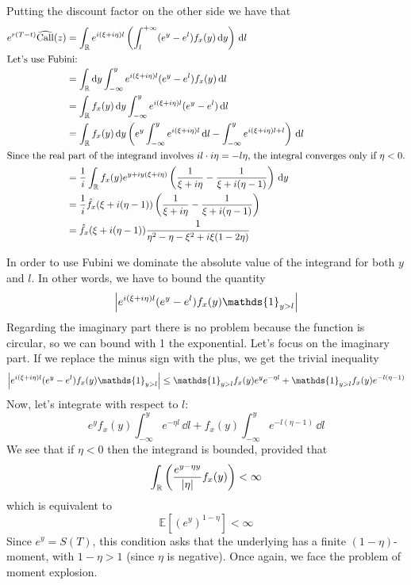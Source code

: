 Putting the discount factor on the other side we have that
\begin{align*}
    e^{r(T-t)}\widehat{\operatorname{Call}}(z) &= \int_{\mathbb{R}} e^{i(\xi+i\eta)l} \left( \int_{l}^{+\infty} (e^y - e^l)f_x(y)\,\dd y \right)\,\dd l \\
    \intertext{Let's use Fubini:}
    &=
    \int_{\mathbb{R}}\dd y \int_{-\infty}^y e^{i(\xi+i\eta)l} (e^y - e^l)f_x(y)\,\dd l \\
    &=
    \int_{\mathbb{R}}f_x(y)\,\dd y \int_{-\infty}^y e^{i(\xi+i\eta)l} (e^y - e^l)\,\dd l \\
    &=
    \int_{\mathbb{R}}f_x(y)\,\dd y \left(e^y \int_{-\infty}^y e^{i(\xi+i\eta)l}\,\dd l - \int_{-\infty}^y e^{i(\xi+i\eta)l + l}\right)\,\dd l \\
    \intertext{Since the real part of the integrand involves $il\cdot i\eta = -l\eta$, the integral converges only if $\eta<0$.}
    &=
    \frac{1}{i} \int_{\mathbb{R}}f_x(y) e^{y + iy(\xi+i\eta)}\left(\frac{1}{\xi+i\eta} - \frac{1}{\xi+i(\eta-1)}\right)\,\dd y \\
    &=
    \frac{1}{i} \hat{f}_x(\xi+i(\eta-1))\left(\frac{1}{\xi+i\eta} - \frac{1}{\xi+i(\eta-1)}\right) \\
    &=
    \hat{f}_x(\xi+i(\eta-1))\frac{1}{\eta^2-\eta-\xi^2+i\xi(1-2\eta)}
\end{align*}
\begin{remark}
    In order to use Fubini we dominate the absolute value of the integrand for both $y$ and $l$. In other words, we have to bound the quantity
    \begin{equation*}
        \abs{e^{i(\xi+i\eta)l} (e^y - e^l)f_x(y)\mathds{1}_{y>l}}
    \end{equation*}
    Regarding the imaginary part there is no problem because the function is circular, so we can bound with 1 the exponential. Let's focus on the imaginary part. If we replace the minus sign with the plus, we get the trivial inequality
    \begin{equation*}
        \abs{e^{i(\xi+i\eta)l} (e^y - e^l)f_x(y)\mathds{1}_{y>l}} \le \mathds{1}_{y>l}f_x(y)e^ye^{-\eta l} + \mathds{1}_{y>l}f_x(y)e^{-l(\eta-1)}
    \end{equation*}
    Now, let's integrate with respect to $l$:
    \begin{equation*}
        e^y f_x(y) \int_{-\infty}^y e^{-\eta l}\,\dd l + f_x(y) \int_{-\infty}^y e^{-l(\eta-1)}\,\dd l
    \end{equation*}
    We see that if $\eta<0$ then the integrand is bounded, provided that
    \begin{equation*}
        \int_{\mathbb{R}}\left(\frac{e^{y-\eta y}}{\abs{\eta}}f_x(y)\right) < \infty
    \end{equation*}
    which is equivalent to
    \begin{equation*}
        \mathbb{E}\left[(e^y)^{1-\eta}\right] < \infty
    \end{equation*}
    Since $e^y = S(T)$, this condition asks that the underlying has a finite $(1-\eta)$-moment, with $1-\eta>1$ (since $\eta$ is negative). Once again, we face the problem of moment explosion.
\end{remark}
